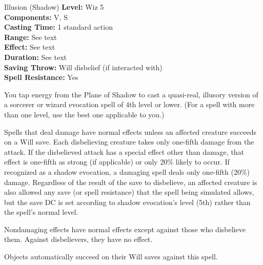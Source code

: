 {Illusion (Shadow)}
{
	\textbf{Level:}
	Wiz 5\\
	\textbf{Components:}
	V, S\\
	\textbf{Casting Time:}
	1 standard action\\
	\textbf{Range:}
	See text\\
	\textbf{Effect:}
	See text\\
	\textbf{Duration:}
	See text\\
	\textbf{Saving Throw:}
	Will disbelief (if interacted with)\\
	\textbf{Spell Resistance:}
	Yes\\
}
{
	You tap energy from the Plane of Shadow to cast a quasi-real, illusory version of a sorcerer or wizard evocation spell of 4th level or lower. (For a spell with more than one level, use the best one applicable to you.)

	Spells that deal damage have normal effects unless an affected creature succeeds on a Will save. Each disbelieving creature takes only one-fifth damage from the attack. If the disbelieved attack has a special effect other than damage, that effect is one-fifth as strong (if applicable) or only 20\% likely to occur. If recognized as a shadow evocation, a damaging spell deals only one-fifth (20\%) damage. Regardless of the result of the save to disbelieve, an affected creature is also allowed any save (or spell resistance) that the spell being simulated allows, but the save DC is set according to shadow evocation's level (5th) rather than the spell's normal level.

	Nondamaging effects have normal effects except against those who disbelieve them. Against disbelievers, they have no effect.

	Objects automatically succeed on their Will saves against this spell.

}
